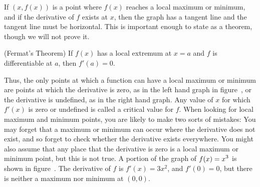 
If $(x,f(x))$ is a point where $f(x)$ reaches a local maximum or minimum,
and if the derivative of $f$ exists at $x$, then the graph has a
tangent line and the tangent line must be horizontal. This is
important enough to state as a theorem, though we will not prove it.

\begin{theorem} (Fermat's Theorem) If $f(x)$ has a local extremum at $x=a$ and
$f$ is differentiable at $a$, then $f'(a)=0$.
\end{theorem}

Thus, the only
points at which a function can have a local maximum or minimum are
points at which the derivative is zero, as in the left hand graph in
figure~,
or the derivative is undefined, as in the right hand graph. Any value
of $x$ for which $f'(x)$ is zero or undefined is called a
{\dfont critical
value\/} for $f$.
When looking for local maximum and minimum points, you are likely to
make two sorts of mistakes: You may forget that a maximum or minimum
can occur where the derivative does not exist, and so forget to check
whether the derivative exists everywhere. You might also assume that
any place that the derivative is zero is a local maximum or minimum
point, but this is not true. A portion of the graph of $\displaystyle f(x)=x^3$ is
shown in figure~. The derivative of $f$ is
$f'(x)=3x^2$, and $f'(0)=0$, but there is neither a maximum nor
minimum at $(0,0)$.

